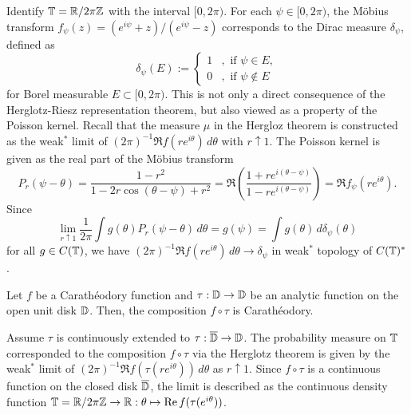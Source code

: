 \documentclass[a4paper]{article}
\begin{document}
\begin{ex}
Identify $\mathbb{T}=\mathbb{R}/2\pi\mathbb{Z}$ with the interval $[0,2\pi)$.
For each $\psi\in[0,2\pi)$, the M\"obius transform $f_\psi(z)=(e^{i\psi}+z)/(e^{i\psi}-z)$ corresponds to the Dirac measure $\delta_\psi$, defined as
\[\delta_\psi(E):=\begin{cases}1&,\text{ if }\psi\in E,\\0&,\text{ if }\psi\notin E\end{cases}\]
for Borel measurable $E\subset[0,2\pi)$.
This is not only a direct consequence of the Herglotz-Riesz representation theorem, but also viewed as a property of the Poisson kernel.
Recall that the measure $\mu$ in the Hergloz theorem is constructed as the weak$^*$ limit of $(2\pi)^{-1}\Re f(re^{i\theta})\,d\theta$ with $r\uparrow1$.
The Poisson kernel is given as the real part of the M\"obius transform
\[P_r(\psi-\theta)=\frac{1-r^2}{1-2r\cos(\theta-\psi)+r^2}=\Re\left(\frac{1+re^{i(\theta-\psi)}}{1-re^{i(\theta-\psi)}}\right)=\Re f_\psi(re^{i\theta}).\]
Since
\[\lim_{r\uparrow1}\frac1{2\pi}\int g(\theta)P_r(\psi-\theta)\,d\theta=g(\psi)=\int g(\theta)\,d\delta_\psi(\theta)\]
for all $g\in C(\mathbb{T})$, we have $(2\pi)^{-1}\Re f(re^{i\theta})\,d\theta\to\delta_\psi$ in weak$^*$ topology of $C(\mathbb{T})^*$.
\end{ex}


\begin{ex}
Let $f$ be a Carath\'eodory function and $\tau:\mathbb{D}\to\mathbb{D}$ be an analytic function on the open unit disk $\mathbb{D}$.
Then, the composition $f\circ\tau$ is Carath\'eodory.

Assume $\tau$ is continuously extended to $\tau:\overline{\mathbb{D}}\to\mathbb{D}$.
The probability measure on $\mathbb{T}$ corresponded to the composition $f\circ\tau$ via the Herglotz theorem is given by the weak$^*$ limit of $(2\pi)^{-1}\Re f(\tau(re^{i\theta}))\,d\theta$ as $r\uparrow1$.
Since $f\circ\tau$ is a continuous function on the closed disk $\overline{\mathbb{D}}$, the limit is described as the continuous density function $\mathbb{T}=\mathbb{R}/2\pi\mathbb{Z}\to\mathbb{R}:\theta\mapsto\operatorname{Re} f(\tau(e^{i\theta}))$.
\end{ex}
\end{document}
